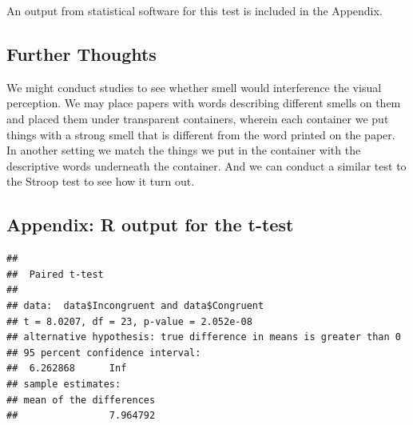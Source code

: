 \documentclass[]{article}
\begin{document}
An output from statistical software for this test is included in the
Appendix.

\subsection{Further Thoughts}\label{further-thoughts}

We might conduct studies to see whether smell would interference the
visual perception. We may place papers with words describing different
smells on them and placed them under transparent containers, wherein
each container we put things with a strong smell that is different from
the word printed on the paper. In another setting we match the things we
put in the container with the descriptive words underneath the
container. And we can conduct a similar test to the Stroop test to see
how it turn out.

\pagebreak  

\subsection{Appendix: R output for the
t-test}\label{appendix-r-output-for-the-t-test}

\begin{verbatim}
## 
##  Paired t-test
## 
## data:  data$Incongruent and data$Congruent
## t = 8.0207, df = 23, p-value = 2.052e-08
## alternative hypothesis: true difference in means is greater than 0
## 95 percent confidence interval:
##  6.262868      Inf
## sample estimates:
## mean of the differences 
##                7.964792
\end{verbatim}
\end{document}
